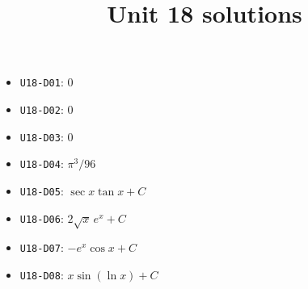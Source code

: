 
\title{Unit 18 solutions}

\maketitle
\begin{itemize}
  \item \texttt{U18-D01}: $0$
  \item \texttt{U18-D02}: $0$
  \item \texttt{U18-D03}: $0$
  \item \texttt{U18-D04}: $\pi^{3}/96$
  \item \texttt{U18-D05}: $\sec x\tan x+C$
  \item \texttt{U18-D06}: $2\sqrt{x}\,e^{x}+C$
  \item \texttt{U18-D07}: $-e^{x}\cos x+C$
  \item \texttt{U18-D08}: $x\sin(\ln x)+C$
\end{itemize}

